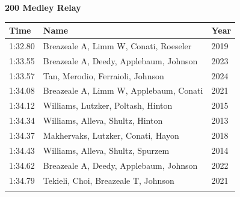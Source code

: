 \noindent\begin{minipage}[t]{0.98\textwidth}
\centering
\textbf{\textcolor{teamprimary}{200 Medley Relay}}\par
\vspace{0.5em}
\centering
\small
\renewcommand{\arraystretch}{1.0}
\setlength{\tabcolsep}{4pt}
\begin{tabular}{@{}p{4.5cm}p{8.5cm}p{2.5cm}@{}}
\toprule
\textbf{Time} & \textbf{Name} & \textbf{Year} \\
\midrule
1:32.80 & Breazeale A, Limm W, Conati, Roeseler & 2019 \\
1:33.55 & Breazeale A, Deedy, Applebaum, Johnson & 2023 \\
1:33.57 & Tan, Merodio, Ferraioli, Johnson & 2024 \\
1:34.08 & Breazeale A, Limm W, Applebaum, Conati & 2021 \\
1:34.12 & Williams, Lutzker, Poltash, Hinton & 2015 \\
1:34.34 & Williams, Alleva, Shultz, Hinton & 2013 \\
1:34.37 & Makhervaks, Lutzker, Conati, Hayon & 2018 \\
1:34.43 & Williams, Alleva, Shultz, Spurzem & 2014 \\
1:34.62 & Breazeale A, Deedy, Applebaum, Johnson & 2022 \\
1:34.79 & Tekieli, Choi, Breazeale T, Johnson & 2021 \\
\bottomrule
\vspace{0.5em}
\end{tabular}
\end{minipage}